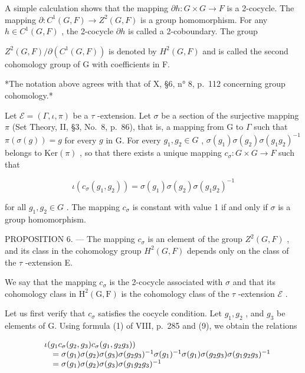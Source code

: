 A simple calculation shows that the mapping \(\partial h: G \times G \to F\) is a 2-cocycle. The mapping \(\partial: C^{1}(G, F) \to Z^{2}(G, F)\) is a group homomorphism. For any \(h \in C^{1}(G, F)\) , the 2-cocycle \(\partial h\) is called a 2-coboundary. The group

\(Z^{2}(G,F)/\partial(C^{1}(G,F))\) is denoted by \(H^{2}(G,F)\) and is called the second cohomology group of G with coefficients in F.

*The notation above agrees with that of X, §6, n° 8, p.~112 concerning group cohomology.*

Let \(\mathcal{E} = (\Gamma, \iota, \pi)\) be a \(\tau\) -extension. Let \(\sigma\) be a section of the surjective mapping \(\pi\) (Set Theory, II, §3, No.~8, p.~86), that is, a mapping from G to \(\Gamma\) such that \(\pi(\sigma(g)) = g\) for every \(g\) in G. For every \(g_1, g_2 \in G\) , \(\sigma(g_1)\sigma(g_2)\sigma(g_1g_2)^{-1}\) belongs to \(\mathrm{Ker}(\pi)\) , so that there exists a unique mapping \(c_\sigma: G \times G \to F\) such that

\[
\iota (c _ {\sigma} (g _ {1}, g _ {2})) = \sigma (g _ {1}) \sigma (g _ {2}) \sigma (g _ {1} g _ {2}) ^ {- 1}\tag{9}
\]

for all \(g_{1}, g_{2} \in G\) . The mapping \(c_{\sigma}\) is constant with value 1 if and only if \(\sigma\) is a group homomorphism.

PROPOSITION 6. --- The mapping \(c_{\sigma}\) is an element of the group \(Z^{2}(G,F)\) , and its class in the cohomology group \(H^{2}(G,F)\) depends only on the class of the \(\tau\) -extension E.

We say that the mapping \(c_{\sigma}\) is the 2-cocycle associated with \(\sigma\) and that its cohomology class in \(\mathrm{H}^2 (\mathrm{G},\mathrm{F})\) is the cohomology class of the \(\tau\) -extension \(\mathcal{E}\) .

Let us first verify that \(c_{\sigma}\) satisfies the cocycle condition. Let \(g_{1}, g_{2}\) , and \(g_{3}\) be elements of G. Using formula (1) of VIII, p.~285 and (9), we obtain the relations

\[
\begin{array}{r l} & {\iota (g _ {1} c _ {\sigma} (g _ {2}, g _ {3}) c _ {\sigma} (g _ {1}, g _ {2} g _ {3}))} \\ & {\quad = \sigma (g _ {1}) \sigma (g _ {2}) \sigma (g _ {3}) \sigma (g _ {2} g _ {3}) ^ {- 1} \sigma (g _ {1}) ^ {- 1} \sigma (g _ {1}) \sigma (g _ {2} g _ {3}) \sigma (g _ {1} g _ {2} g _ {3}) ^ {- 1}} \\ & {\quad = \sigma (g _ {1}) \sigma (g _ {2}) \sigma (g _ {3}) \sigma (g _ {1} g _ {2} g _ {3}) ^ {- 1}} \end{array}
\]

